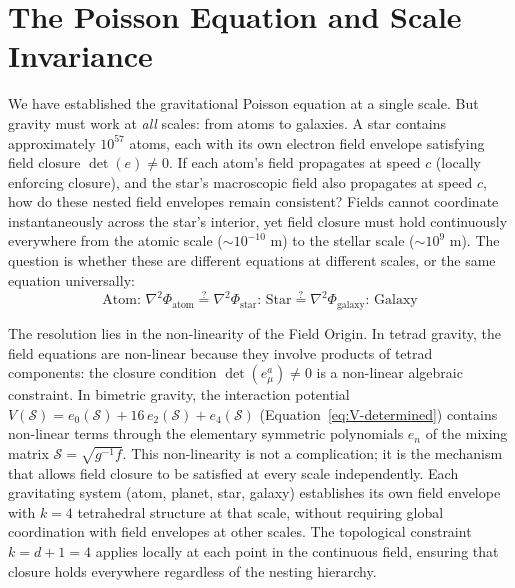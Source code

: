 \documentclass[aps,prd,preprint,superscriptaddress,showpacs,preprintnumbers,amsmath,amssymb,nofootinbib]{revtex4-2}
\begin{document}
\section{The Poisson Equation and Scale Invariance}
\label{sec:poisson-scale-invariance}


We have established the gravitational Poisson equation at a single scale. But gravity must work at \emph{all} scales: from atoms to galaxies. A star contains approximately $10^{57}$ atoms, each with its own electron field envelope satisfying field closure $\det(e) \neq 0$. If each atom's field propagates at speed $c$ (locally enforcing closure), and the star's macroscopic field also propagates at speed $c$, how do these nested field envelopes remain consistent? Fields cannot coordinate instantaneously across the star's interior, yet field closure must hold continuously everywhere from the atomic scale ($\sim 10^{-10}$ m) to the stellar scale ($\sim 10^9$ m). The question is whether these are different equations at different scales, or the same equation universally:
\begin{equation}
\text{Atom: } \nabla^2\Phi_{\text{atom}} \stackrel{?}{=} \nabla^2\Phi_{\text{star}} \text{: Star} \stackrel{?}{=} \nabla^2\Phi_{\text{galaxy}} \text{: Galaxy}
\label{eq:scaling-question}
\end{equation}

The resolution lies in the non-linearity of the Field Origin. In tetrad gravity, the field equations are non-linear because they involve products of tetrad components: the closure condition $\det(e_\mu^a) \neq 0$ is a non-linear algebraic constraint. In bimetric gravity, the interaction potential $V(\mathcal{S}) = e_0(\mathcal{S}) + 16\,e_2(\mathcal{S}) + e_4(\mathcal{S})$ (Equation~\ref{eq:V-determined}) contains non-linear terms through the elementary symmetric polynomials $e_n$ of the mixing matrix $\mathcal{S} = \sqrt{g^{-1}f}$. This non-linearity is not a complication; it is the mechanism that allows field closure to be satisfied at every scale independently. Each gravitating system (atom, planet, star, galaxy) establishes its own field envelope with $k=4$ tetrahedral structure at that scale, without requiring global coordination with field envelopes at other scales. The topological constraint $k = d+1 = 4$ applies locally at each point in the continuous field, ensuring that closure holds everywhere regardless of the nesting hierarchy.
\end{document}
